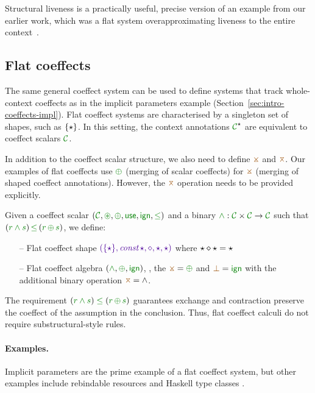 \noindent
Structural liveness is a practically useful, precise version of an example from our earlier
work, which was a flat system overapproximating liveness to the entire
context~\cite{petricek2013coeffects}.


\subsection{Flat coeffects}
\label{sec:unified-flat}

The same general coeffect system can be used to define systems that track whole-context coeffects
as in the implicit parameters example 
(Section~\ref{sec:intro-coeffects-impl}). Flat coeffect systems are
characterised by a singleton set of shapes, such as ${ \{ \star \} }$. In
this setting, the context annotations $\C^{ \sflat }$ are
equivalent to coeffect scalars $\C$.

In addition to the coeffect scalar structure, we also need to define $\asplit$ and $\amerge$.
Our examples of flat coeffects use $\cpar$ (merging of scalar coeffects) for $\asplit$ (merging of shaped 
coeffect annotations). However, the $\amerge$ operation needs to be provided explicitly.

\begin{definition}
Given a coeffect scalar $(\C, \cseq, \cpar, \cunit, \czero, \cleq)$ and a binary 
$\cclrd{\wedge} : \C \times \C \rightarrow \C$ such that $(\cclrd{r \wedge s}) \,\cleq\, (\cclrd{r}\,\cpar\,\cclrd{s})$, we define:
\begin{itemize}{}
\item[--] Flat coeffect shape $\sclrd{(\{ \sflat \}, \emph{const} \, \sflat, \diamond, \sflat, \sflat)}$ where 
  $\star \diamond \star = \star$
\item[--] Flat coeffect algebra $(\cclrd{\wedge}, \cpar, \czero)$, \ie{}, the $\asplit = \cpar$ and $\azero = 
\czero$ with the additional binary operation $\amerge = \wedge$. 
\end{itemize}
\end{definition}

\noindent
The requirement $(\cclrd{r \wedge s}) \;\cleq\; (\cclrd{r}\,\cpar\,\cclrd{s})$ guarantees 
exchange and contraction preserve the coeffect of the assumption in the conclusion. Thus, flat coeffect
calculi do not require substructural-style rules.
 
\paragraph{Examples.}
Implicit parameters are the prime example of a flat coeffect system, but other examples
include rebindable resources \cite{app-distributed-acute} and Haskell type classes \cite{orchard2013thesis}.

